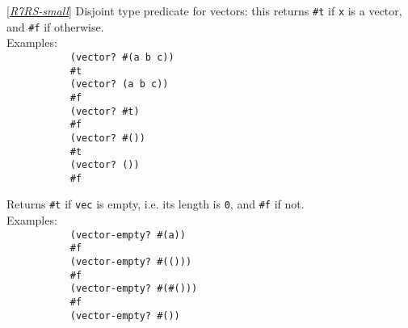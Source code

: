 \begin{description}
\tightlist
\item[ \href{}{(vector? \emph{x}) -\textgreater{} boolean} ]
{[}\protect\hyperlink{R7RS-small}{\emph{R7RS-small}}{]} Disjoint type
predicate for vectors: this returns \texttt{\#t} if \texttt{x} is a
vector, and \texttt{\#f} if
otherwise.\\[2\baselineskip]Examples:\\[2\baselineskip]\texttt{\ \ \ \ \ \ \ \ \ \ \ (vector?\ \textquotesingle{}\#(a\ b\ c))\ \ \ \ \ \ \ \ \ }\\
\texttt{\ \ \ \ \ \ \ \ \ \ \ \#t\ \ \ \ \ \ \ \ \ }\\[2\baselineskip]\texttt{\ \ \ \ \ \ \ \ \ \ \ (vector?\ \textquotesingle{}(a\ b\ c))\ \ \ \ \ \ \ \ \ }\\
\texttt{\ \ \ \ \ \ \ \ \ \ \ \#f\ \ \ \ \ \ \ \ \ }\\[2\baselineskip]\texttt{\ \ \ \ \ \ \ \ \ \ \ (vector?\ \#t)\ \ \ \ \ \ \ \ \ }\\
\texttt{\ \ \ \ \ \ \ \ \ \ \ \#f\ \ \ \ \ \ \ \ \ }\\[2\baselineskip]\texttt{\ \ \ \ \ \ \ \ \ \ \ (vector?\ \textquotesingle{}\#())\ \ \ \ \ \ \ \ \ }\\
\texttt{\ \ \ \ \ \ \ \ \ \ \ \#t\ \ \ \ \ \ \ \ \ }\\[2\baselineskip]\texttt{\ \ \ \ \ \ \ \ \ \ \ (vector?\ \textquotesingle{}())\ \ \ \ \ \ \ \ \ }\\
\texttt{\ \ \ \ \ \ \ \ \ \ \ \#f\ \ \ \ \ \ \ \ \ }\\[2\baselineskip]
\item[ \href{}{(vector-empty? \emph{vec}) -\textgreater{} boolean} ]
Returns \texttt{\#t} if \texttt{vec} is empty, i.e. its length is
\texttt{0}, and \texttt{\#f} if
not.\\[2\baselineskip]Examples:\\[2\baselineskip]\texttt{\ \ \ \ \ \ \ \ \ \ \ (vector-empty?\ \textquotesingle{}\#(a))\ \ \ \ \ \ \ \ \ }\\
\texttt{\ \ \ \ \ \ \ \ \ \ \ \#f\ \ \ \ \ \ \ \ \ }\\[2\baselineskip]\texttt{\ \ \ \ \ \ \ \ \ \ \ (vector-empty?\ \textquotesingle{}\#(()))\ \ \ \ \ \ \ \ \ }\\
\texttt{\ \ \ \ \ \ \ \ \ \ \ \#f\ \ \ \ \ \ \ \ \ }\\[2\baselineskip]\texttt{\ \ \ \ \ \ \ \ \ \ \ (vector-empty?\ \textquotesingle{}\#(\#()))\ \ \ \ \ \ \ \ \ }\\
\texttt{\ \ \ \ \ \ \ \ \ \ \ \#f\ \ \ \ \ \ \ \ \ }\\[2\baselineskip]\texttt{\ \ \ \ \ \ \ \ \ \ \ (vector-empty?\ \textquotesingle{}\#())\ \ \ \ \ \ \ \ \ }\\

\end{description}
